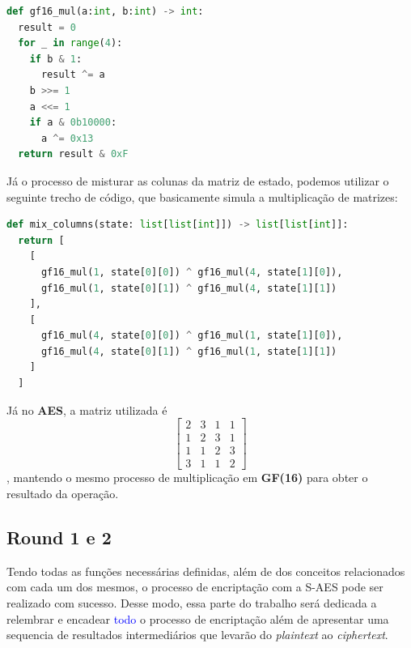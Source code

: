 \documentclass[12pt]{article}
\newcommand{\blue}[1]{\textcolor{blue}{#1}}
\begin{document}
\begin{lstlisting}[language=Python]
def gf16_mul(a:int, b:int) -> int:
  result = 0
  for _ in range(4):
    if b & 1:
      result ^= a
    b >>= 1
    a <<= 1
    if a & 0b10000:
      a ^= 0x13
  return result & 0xF
\end{lstlisting}

Já o processo de misturar as colunas da matriz de estado, podemos utilizar o seguinte trecho de código, que basicamente simula a multiplicação de matrizes:

\begin{lstlisting}[language=Python]
def mix_columns(state: list[list[int]]) -> list[list[int]]:
  return [
    [
      gf16_mul(1, state[0][0]) ^ gf16_mul(4, state[1][0]), 
      gf16_mul(1, state[0][1]) ^ gf16_mul(4, state[1][1])
    ],
    [
      gf16_mul(4, state[0][0]) ^ gf16_mul(1, state[1][0]),
      gf16_mul(4, state[0][1]) ^ gf16_mul(1, state[1][1]) 
    ]
  ]
\end{lstlisting}

Já no \textbf{AES}, a matriz utilizada é $$
\begin{bmatrix}
  2 & 3 & 1 & 1 \\
  1 & 2 & 3 & 1 \\
  1 & 1 & 2 & 3 \\
  3 & 1 & 1 & 2
\end{bmatrix}
$$, mantendo o mesmo processo de multiplicação em \textbf{GF(16)} para obter o resultado da operação.

\subsection{Round 1 e 2}
Tendo todas as funções necessárias definidas, além de dos conceitos relacionados com cada um dos mesmos, o processo de encriptação com a S-AES pode ser realizado com sucesso. Desse modo, essa parte do trabalho será dedicada a relembrar e encadear \blue{todo} o processo de encriptação além de apresentar uma sequencia de resultados intermediários que levarão do \textit{plaintext} ao \textit{ciphertext}.
\end{document}
